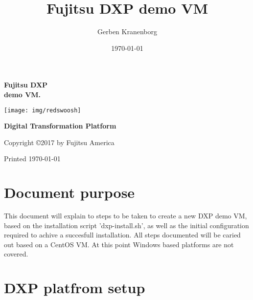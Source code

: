 



\frontmatter
\title{Fujitsu DXP demo VM}
\author{Gerben Kranenborg}
\date{\today}



\noindent \textsf{\textbf{\Huge Fujitsu DXP\\}}
\noindent \textsf{\textbf{\Large demo VM.\\}}

\vspace{0.75in}

\centerline{\texttt{[image: img/redswoosh]}}

\vspace{0.75in}

\noindent \textsf{\textbf{\Huge Digital Transformation Platform}}

\vspace{0.75in}

\noindent
Copyright \copyright 2017 by Fujitsu America
\newline

\noindent
Printed \today

\tableofcontents

\chapter{Document purpose}

\begin{myindent}
This document will explain to steps to be taken to create a new DXP demo VM, based on the installation script 'dxp-install.sh',
as well as the initial configuration required to achive a succesfull installation. All steps documented will be caried out based
on a CentOS VM. At this point Windows based platforms are not covered.
\end{myindent}

{\let\clearpage\relax\par \chapter{DXP platfrom setup}}

